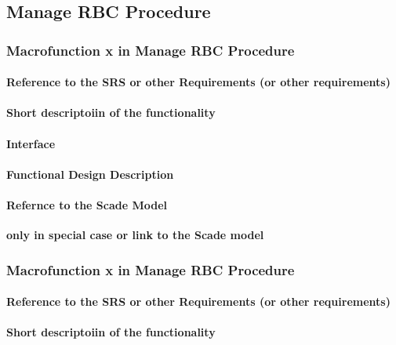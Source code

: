 \subsection{Manage RBC Procedure}

\subsubsection{Macrofunction x in Manage RBC Procedure}%
\paragraph{Reference to the SRS or other Requirements (or other requirements)}
\paragraph{Short descriptoiin of the functionality}
\paragraph{Interface}
\paragraph{Functional Design Description}
\paragraph{Refernce to the Scade Model}
\textbf{only in special case or link to the Scade model}

\subsubsection{Macrofunction x in Manage RBC Procedure}%
\paragraph{Reference to the SRS or other Requirements (or other requirements)}
\paragraph{Short descriptoiin of the functionality}
